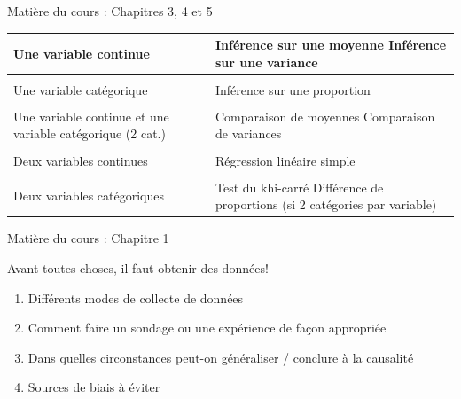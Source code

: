 \documentclass{BeamerTemplate}
\begin{document}
\begin{frame}{Matière du cours : Chapitres 3, 4 et 5}

{ \small 
\vspace*{-0.15in}
\begin{table}
\begin{tabular}{p{5cm}|p{5cm}}
Une variable continue & Inférence sur une moyenne \newline Inférence sur une variance \\[5pt]
\hline \\[1pt]
\pause
Une variable catégorique & Inférence sur une proportion \\[5pt]
\hline  \\[1pt]
\pause
Une variable continue et une variable catégorique (2 cat.) & Comparaison de moyennes \newline Comparaison de variances \\[5pt] 
\hline  \\[1pt]
\pause
Deux variables continues & Régression linéaire simple \\[5pt]
\hline \\[1pt]
\pause
Deux variables catégoriques & Test du khi-carré \newline Différence de proportions \newline (si 2 catégories par variable) 
\end{tabular}
\end{table}
}

\end{frame}


\begin{frame}{Matière du cours : Chapitre 1}

Avant toutes choses, il faut obtenir des données!

\begin{enumerate}
\item Différents modes de collecte de données
\item Comment faire un sondage ou une expérience de façon appropriée
\item Dans quelles circonstances peut-on généraliser / conclure à la causalité
\item Sources de biais à éviter
\end{enumerate}


\end{frame}
\end{document}
